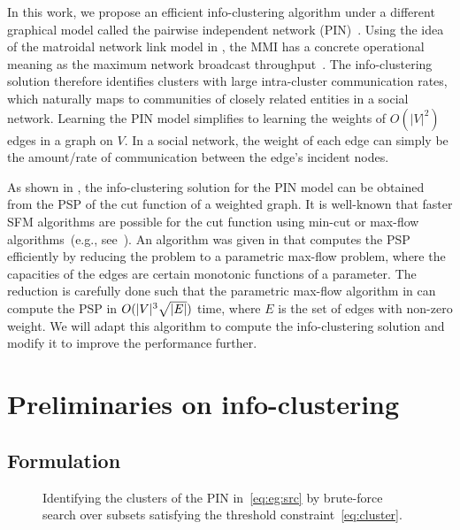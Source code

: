 \documentclass[conference,letterpaper]{IEEEtran}
\begin{document}
In this work, we propose an efficient info-clustering algorithm under a different graphical model
called the pairwise independent network (PIN)~\cite{nitinawarat-ye10,nitinawarat10}. Using the idea
of the matroidal network link model in \cite{chan12ud}, the MMI has a concrete operational meaning
as the maximum network broadcast throughput~\cite{chan11isit}. The info-clustering solution
therefore identifies clusters with large intra-cluster communication rates, which naturally maps to
communities of closely related entities in a social network. Learning the PIN model simplifies to
learning the weights of $O(|V|^2)$ edges in a graph on $V$. In a social network, the weight
of each edge can simply be the amount/rate of communication between the edge's incident nodes.

As shown in \cite[Proposition~9]{chan16cluster}, the info-clustering solution for the PIN model can
be obtained from the PSP of the cut function of a weighted graph. It is well-known that faster SFM
algorithms are possible for the cut function using min-cut or max-flow algorithms~(e.g.,
see~\cite{fujishige1999minimizing,queyranne1998minimizing,jegelka2011fast}). An algorithm was given
in \cite{kolmogorov10} that computes the PSP efficiently by reducing the problem to a
parametric max-flow problem, where the capacities of the edges are certain monotonic functions of a
parameter. The reduction is carefully done such that the parametric max-flow algorithm in
\cite{gallo89} can compute the PSP in $O(\lvert V\rvert^3\sqrt {\lvert E\rvert})$ time, where $E$ is the
set of edges with non-zero weight. We will adapt this algorithm to compute the info-clustering
solution and modify it to improve the performance further.



\section{Preliminaries on info-clustering}

\subsection{Formulation}

\begin{figure*}
	\begin{center}
		\hfill
		\hfill
	\end{center}
	\caption{Identifying the clusters of the PIN in~\eqref{eq:eg:src} by brute-force search over subsets satisfying the threshold constraint~\eqref{eq:cluster}.}
\label{fig:eg:PSP}
\end{figure*}
\end{document}
